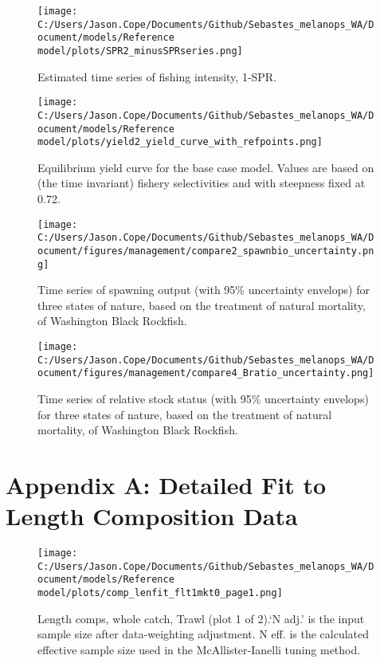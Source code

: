 \documentclass[11pt,
  english,
  letterpaper,
]{article}
\begin{document}
\pagebreak

\begin{figure}
\centering
\texttt{[image: C:/Users/Jason.Cope/Documents/Github/Sebastes\_melanops\_WA/Document/models/Reference model/plots/SPR2\_minusSPRseries.png]}
\caption{Estimated time series of fishing intensity, 1-SPR.\label{fig:1-spr}}
\end{figure}

\pagebreak

\begin{figure}
\centering
\texttt{[image: C:/Users/Jason.Cope/Documents/Github/Sebastes\_melanops\_WA/Document/models/Reference model/plots/yield2\_yield\_curve\_with\_refpoints.png]}
\caption{Equilibrium yield curve for the base case model. Values are based on (the time invariant) fishery selectivities and with steepness fixed at 0.72.\label{fig:yield}}
\end{figure}

\pagebreak

\begin{figure}
\centering
\texttt{[image: C:/Users/Jason.Cope/Documents/Github/Sebastes\_melanops\_WA/Document/figures/management/compare2\_spawnbio\_uncertainty.png]}
\caption{Time series of spawning output (with 95\% uncertainty envelops) for three states of nature, based on the treatment of natural mortality, of Washington Black Rockfish.\label{fig:stateofnature_SO}}
\end{figure}

\begin{figure}
\centering
\texttt{[image: C:/Users/Jason.Cope/Documents/Github/Sebastes\_melanops\_WA/Document/figures/management/compare4\_Bratio\_uncertainty.png]}
\caption{Time series of relative stock status (with 95\% uncertainty envelops) for three states of nature, based on the treatment of natural mortality, of Washington Black Rockfish.\label{fig:stateofnature_depl}}
\end{figure}

\newpage

\clearpage

\hypertarget{app-a}{%
\section{Appendix A: Detailed Fit to Length Composition Data}\label{app-a}}

\begin{figure}
\centering
\texttt{[image: C:/Users/Jason.Cope/Documents/Github/Sebastes\_melanops\_WA/Document/models/Reference model/plots/comp\_lenfit\_flt1mkt0\_page1.png]}
\caption{Length comps, whole catch, Trawl (plot 1 of 2).`N adj.' is the input sample size after data-weighting adjustment. N eff. is the calculated effective sample size used in the McAllister-Ianelli tuning method.\label{fig:comp_lenfit_flt1mkt0_page1}}
\end{figure}
\end{document}
